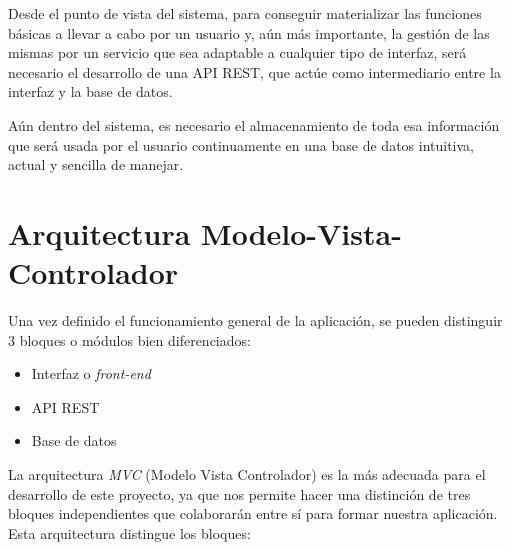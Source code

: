 Desde el punto de vista del sistema, para conseguir materializar las funciones básicas a llevar a cabo por un usuario y, aún más importante, la gestión de las mismas por un servicio que sea adaptable a cualquier tipo de interfaz, será necesario el desarrollo de una API REST, que actúe como intermediario entre la interfaz y la base de datos.

Aún dentro del sistema, es necesario el almacenamiento de toda esa información que será usada por el usuario continuamente en una base de datos intuitiva, actual y sencilla de manejar.


\section{Arquitectura Modelo-Vista-Controlador}
\label{sec::arquitecturaMVC}
Una vez definido el funcionamiento general de la aplicación, se pueden distinguir 3 bloques o módulos bien diferenciados:

\begin{itemize}
    \item Interfaz o \textit{front-end}
    \item API REST
    \item Base de datos
\end{itemize}
 
 La arquitectura \textit{MVC} (Modelo Vista Controlador) es la más adecuada para el desarrollo de este proyecto, ya que nos permite hacer una distinción de tres bloques independientes que colaborarán entre sí para formar nuestra aplicación\cite{mvc2}\cite{mvc3}. Esta arquitectura distingue los bloques\cite{mvc1}:
 
